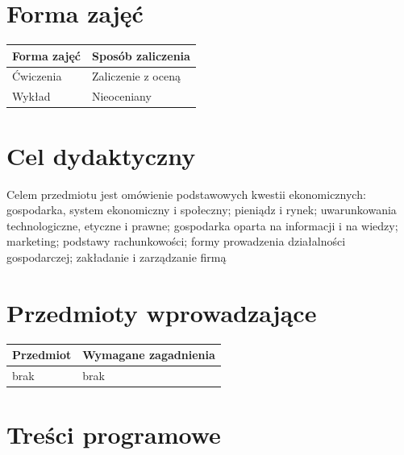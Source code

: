 \documentclass[12pt, a4paper]{article}
\begin{document}
\section{Forma zajęć}

\begin{tabular}{ll}
  \hline
  \textbf{Forma zajęć} & \textbf{Sposób zaliczenia} \\
  \hline
  Ćwiczenia & Zaliczenie z oceną \\
  Wykład & Nieoceniany \\
  \hline
\end{tabular}

\section{Cel dydaktyczny}

Celem przedmiotu jest omówienie podstawowych kwestii ekonomicznych: gospodarka, system ekonomiczny i społeczny; pieniądz i rynek; uwarunkowania technologiczne, etyczne i prawne; gospodarka oparta na informacji i na wiedzy; marketing; podstawy rachunkowości; formy prowadzenia działalności gospodarczej; zakładanie i zarządzanie firmą

\section{Przedmioty wprowadzające}

\begin{tabularx}{\textwidth}{lX}
  \hline
  \textbf{Przedmiot} & \textbf{Wymagane zagadnienia} \\
  \hline
  brak & brak \\
  \hline
\end{tabularx}

\section{Treści programowe}
\end{document}
